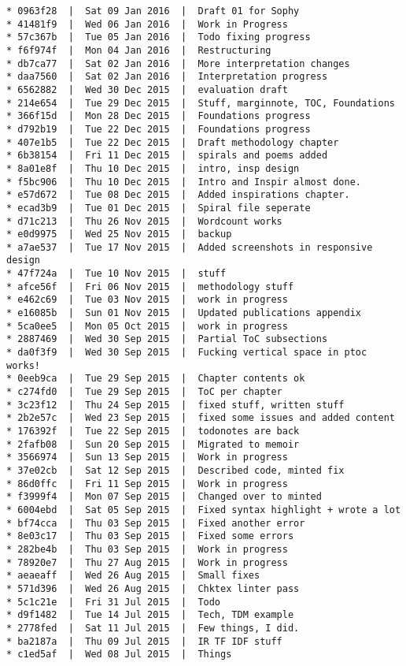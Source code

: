 \begin{verbatim}
* 0963f28  |  Sat 09 Jan 2016  |  Draft 01 for Sophy
* 41481f9  |  Wed 06 Jan 2016  |  Work in Progress
* 57c367b  |  Tue 05 Jan 2016  |  Todo fixing progress
* f6f974f  |  Mon 04 Jan 2016  |  Restructuring
* db7ca77  |  Sat 02 Jan 2016  |  More interpretation changes
* daa7560  |  Sat 02 Jan 2016  |  Interpretation progress
* 6562882  |  Wed 30 Dec 2015  |  evaluation draft
* 214e654  |  Tue 29 Dec 2015  |  Stuff, marginnote, TOC, Foundations
* 366f15d  |  Mon 28 Dec 2015  |  Foundations progress
* d792b19  |  Tue 22 Dec 2015  |  Foundations progress
* 407e1b5  |  Tue 22 Dec 2015  |  Draft methodology chapter
* 6b38154  |  Fri 11 Dec 2015  |  spirals and poems added
* 8a01e8f  |  Thu 10 Dec 2015  |  intro, insp design
* f5bc906  |  Thu 10 Dec 2015  |  Intro and Inspir almost done.
* e57d672  |  Tue 08 Dec 2015  |  Added inspirations chapter.
* ecad3b9  |  Tue 01 Dec 2015  |  Spiral file seperate
* d71c213  |  Thu 26 Nov 2015  |  Wordcount works
* e0d9975  |  Wed 25 Nov 2015  |  backup
* a7ae537  |  Tue 17 Nov 2015  |  Added screenshots in responsive design
* 47f724a  |  Tue 10 Nov 2015  |  stuff
* afce56f  |  Fri 06 Nov 2015  |  methodology stuff
* e462c69  |  Tue 03 Nov 2015  |  work in progress
* e16085b  |  Sun 01 Nov 2015  |  Updated publications appendix
* 5ca0ee5  |  Mon 05 Oct 2015  |  work in progress
* 2887469  |  Wed 30 Sep 2015  |  Partial ToC subsections
* da0f3f9  |  Wed 30 Sep 2015  |  Fucking vertical space in ptoc works!
* 0eeb9ca  |  Tue 29 Sep 2015  |  Chapter contents ok
* c274fd0  |  Tue 29 Sep 2015  |  ToC per chapter
* 3c23f12  |  Thu 24 Sep 2015  |  fixed stuff, written stuff
* 2b2e57c  |  Wed 23 Sep 2015  |  fixed some issues and added content
* 176392f  |  Tue 22 Sep 2015  |  todonotes are back
* 2fafb08  |  Sun 20 Sep 2015  |  Migrated to memoir
* 3566974  |  Sun 13 Sep 2015  |  Work in progress
* 37e02cb  |  Sat 12 Sep 2015  |  Described code, minted fix
* 86d0ffc  |  Fri 11 Sep 2015  |  Work in progress
* f3999f4  |  Mon 07 Sep 2015  |  Changed over to minted
* 6004ebd  |  Sat 05 Sep 2015  |  Fixed syntax highlight + wrote a lot
* bf74cca  |  Thu 03 Sep 2015  |  Fixed another error
* 8e03c17  |  Thu 03 Sep 2015  |  Fixed some errors
* 282be4b  |  Thu 03 Sep 2015  |  Work in progress
* 78920e7  |  Thu 27 Aug 2015  |  Work in progress
* aeaeaff  |  Wed 26 Aug 2015  |  Small fixes
* 571d396  |  Wed 26 Aug 2015  |  Chktex linter pass
* 5c1c21e  |  Fri 31 Jul 2015  |  Todo
* d9f1482  |  Tue 14 Jul 2015  |  Tech, TDM example
* 2778fed  |  Sat 11 Jul 2015  |  Few things, I did.
* ba2187a  |  Thu 09 Jul 2015  |  IR TF IDF stuff
* c1ed5af  |  Wed 08 Jul 2015  |  Things

\end{verbatim}
